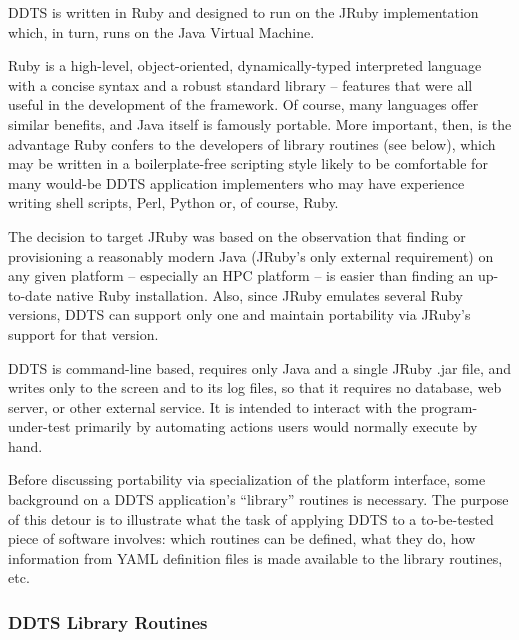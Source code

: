 \documentclass[conference]{IEEEtran}
\begin{document}
DDTS is written in Ruby \cite{ruby} and designed to run on the JRuby \cite{jruby} implementation which, in turn, runs on the Java Virtual Machine.

Ruby is a high-level, object-oriented, dynamically-typed interpreted language with a concise syntax and a robust standard library -- features that were all useful in the development of the framework. Of course, many languages offer similar benefits, and Java itself is famously portable. More important, then, is the advantage Ruby confers to the developers of library routines (see below), which may be written in a boilerplate-free scripting style likely to be comfortable for many would-be DDTS application implementers who may have experience writing shell scripts, Perl, Python or, of course, Ruby.

The decision to target JRuby was based on the observation that finding or provisioning a reasonably modern Java (JRuby's only external requirement) on any given platform -- especially an HPC platform -- is easier than finding an up-to-date native Ruby installation. Also, since JRuby emulates several Ruby versions, DDTS can support only one and maintain portability via JRuby's support for that version.

DDTS is command-line based, requires only Java and a single JRuby .jar file, and writes only to the screen and to its log files, so that it requires no database, web server, or other external service. It is intended to interact with the program-under-test primarily by automating actions users would normally execute by hand.

Before discussing portability via specialization of the platform interface, some background on a DDTS application's ``library'' routines is necessary. The purpose of this detour is to illustrate what the task of applying DDTS to a to-be-tested piece of software involves: which routines can be defined, what they do, how information from YAML definition files is made available to the library routines, etc.

\subsubsection{DDTS Library Routines}
\end{document}
